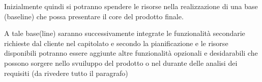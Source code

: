	Inizialmente quindi si potranno spendere le risorse nella realizzazione di una base (baseline) che possa presentare il core del prodotto finale.
	
	A tale base(line) saranno successivamente integrate le funzionalità secondarie richieste dal cliente nel capitolato e secondo la pianificazione e le risorse disponibili potranno essere aggiunte altre funzionalità opzionali e desidarabili che possono sorgere nello svuiluppo del prodotto o nel durante delle analisi dei requisiti (da rivedere tutto il paragrafo)
	